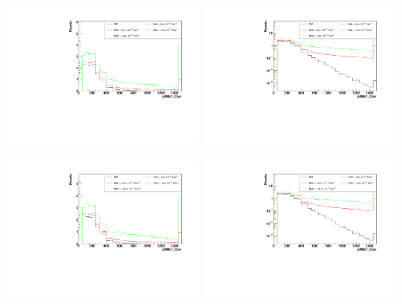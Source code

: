 \begin{figure}[h]
  \begin{center}
	\includegraphics[width=0.45\textwidth]{Plots/aQGC_kinematics/pfMET_Corr_FM6.pdf}%
	\includegraphics[width=0.45\textwidth]{Plots/aQGC_kinematics/pfMET_Corr_FM6_log.pdf}\\				
    \caption{}
  \end{center}
\end{figure}
\begin{figure}[h]
  \begin{center}
	\includegraphics[width=0.45\textwidth]{Plots/aQGC_kinematics/pfMET_Corr_FM7.pdf}%
	\includegraphics[width=0.45\textwidth]{Plots/aQGC_kinematics/pfMET_Corr_FM7_log.pdf}\\				
    \caption{}
  \end{center}
\end{figure}
